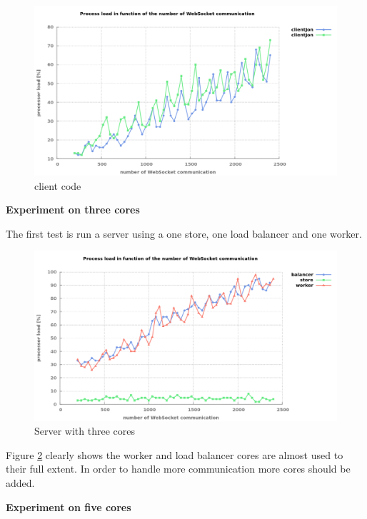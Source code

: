 \begin{figure}[H]
	\centering
		\includegraphics[width=\textwidth]{./Figures/WS_client_rising.png}
	\caption[Simple WebSocket client]{client code}
	\label{fig:WS_client_rising}
\end{figure}

\textbf{Experiment on three cores}

The first test is run a server using a one store, one load balancer and one
worker.

\begin{figure}[H]
	\centering
		\includegraphics[width=\textwidth]{./Figures/WS_server_1rising.png}
	\caption[WebSocket server on three cores]{Server with three cores}
	\label{fig:WS_server_1rising}
\end{figure}

Figure \ref{fig:WS_server_1rising} clearly shows the worker and load balancer
cores are almost used to their full extent. In order to handle more communication more
cores should be added. 

\textbf{Experiment on five cores}


